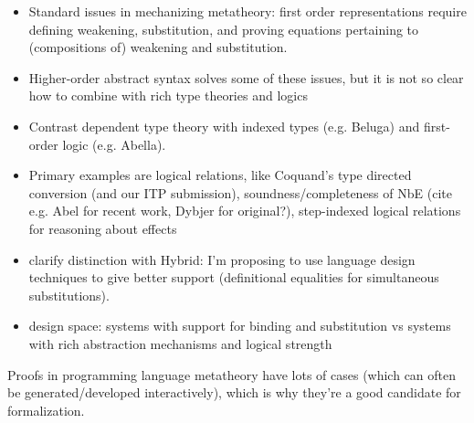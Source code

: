 \documentclass{article}
\begin{document}
\begin{itemize}
\item Standard issues in mechanizing metatheory: first order
  representations require defining weakening, substitution, and proving
  equations pertaining to (compositions of) weakening and
  substitution.
\item Higher-order abstract syntax solves some of these issues, but it
  is not so clear how to combine with rich type theories and logics
\item Contrast dependent type theory with indexed types (e.g. Beluga) and first-order
logic (e.g. Abella). 

\item Primary examples are logical relations, like Coquand's type
directed conversion (and our ITP submission), soundness/completeness of NbE
(cite e.g. Abel for recent work, Dybjer for original?),
step-indexed logical relations for reasoning about effects

\item clarify distinction with Hybrid: I'm proposing to use language design
techniques to give better support (definitional equalities for
simultaneous substitutions).

\item design space: systems with support for binding and substitution vs
systems with rich abstraction mechanisms and logical strength






\end{itemize}

Proofs in programming language metatheory have lots of cases (which
can often be generated/developed interactively), which is why they're
a good candidate for formalization.
\end{document}
